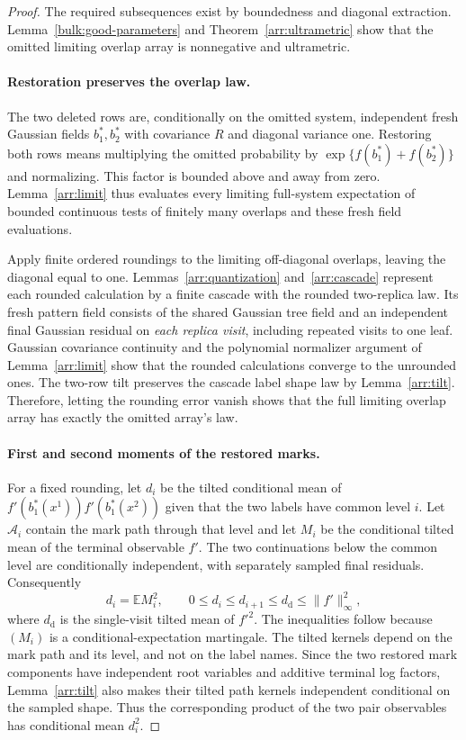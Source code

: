 \begin{proof}
The required subsequences exist by boundedness and diagonal extraction.
Lemma~\ref{bulk:good-parameters} and Theorem~\ref{arr:ultrametric} show
that the omitted limiting overlap array is nonnegative and ultrametric.

\paragraph{Restoration preserves the overlap law.}
The two deleted rows are, conditionally on the omitted system,
independent fresh Gaussian fields $b_1^*,b_2^*$ with covariance $R$ and
diagonal variance one.  Restoring both rows means multiplying the
omitted probability by
$\exp\{f(b_1^*)+f(b_2^*)\}$ and normalizing.  This factor is bounded
above and away from zero.  Lemma~\ref{arr:limit} thus evaluates every
limiting full-system expectation of bounded continuous tests of
finitely many overlaps and these fresh field evaluations.

Apply finite ordered roundings to the limiting off-diagonal overlaps,
leaving the diagonal equal to one.  Lemmas~\ref{arr:quantization}
and~\ref{arr:cascade} represent each rounded calculation by a finite
cascade with the rounded two-replica law.  Its fresh pattern field
consists of the shared Gaussian tree field and an independent final
Gaussian residual on \emph{each replica visit}, including repeated
visits to one leaf.  Gaussian covariance continuity and the polynomial
normalizer argument of Lemma~\ref{arr:limit} show that the rounded
calculations converge to the unrounded ones.  The two-row tilt preserves
the cascade label shape law by Lemma~\ref{arr:tilt}.  Therefore, letting
the rounding error vanish shows that the full limiting overlap array
has exactly the omitted array's law.

\paragraph{First and second moments of the restored marks.}
For a fixed rounding, let
$d_i$ be the tilted conditional mean of
$f'(b_1^*(x^1))f'(b_1^*(x^2))$ given that the two labels have common level
$i$.  Let $\mathcal A_i$ contain the mark path through that level and let
$M_i$ be the conditional tilted mean of the terminal observable $f'$.
The two continuations below the common level are conditionally
independent, with separately sampled final residuals.  Consequently
\[
 d_i=\mathbb E M_i^2,\qquad
 0\le d_i\le d_{i+1}\le d_{\mathrm d}\le\|f'\|_\infty^2,
\]
where $d_{\mathrm d}$ is the single-visit tilted mean of $f'^2$.
The inequalities follow because $(M_i)$ is a conditional-expectation
martingale.  The tilted kernels depend on the mark path and its level,
and not on the label names.  Since the two restored mark components
have independent root variables and additive terminal log factors,
Lemma~\ref{arr:tilt} also makes their tilted path kernels independent
conditional on the sampled shape.  Thus the corresponding product of
the two pair observables has conditional mean $d_i^2$.


\end{proof}

